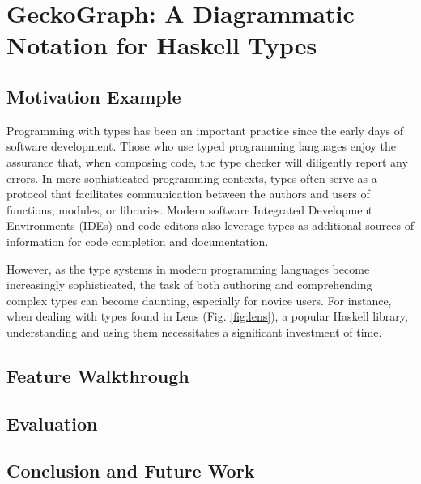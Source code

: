 


\chapter{GeckoGraph: A Diagrammatic Notation for Haskell Types}

\label{chapter5} 


\section{Motivation Example}

Programming with types has been an important practice since the early days of software development. Those who use typed programming languages enjoy the assurance that, when composing code, the type checker will diligently report any errors. In more sophisticated programming contexts, types often serve as a protocol that facilitates communication between the authors and users of functions, modules, or libraries. Modern software Integrated Development Environments (IDEs) and code editors also leverage types as additional sources of information for code completion and documentation.
 
However, as the type systems in modern programming languages become increasingly sophisticated, the task of both authoring and comprehending complex types can become daunting, especially for novice users. For instance, when dealing with types found in Lens (Fig. \ref{fig:lens}), a popular Haskell library, understanding and using them necessitates a significant investment of time.
 

\section{Feature Walkthrough}

\section{Evaluation}

\section{Conclusion and Future Work}